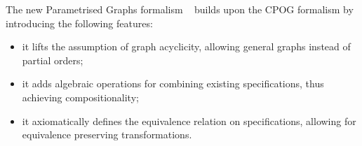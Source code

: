 The new Parametrised Graphs formalism ~\cite{2011_mokhov_pg} builds upon the CPOG formalism by introducing the following features:
\begin{itemize}
\item{it lifts the assumption of graph acyclicity, allowing general graphs instead of partial orders;}
\item{it adds algebraic operations for combining existing specifications, thus achieving compositionality;}
\item{it axiomatically defines the equivalence relation on specifications, allowing for equivalence preserving transformations.}
\end{itemize}

